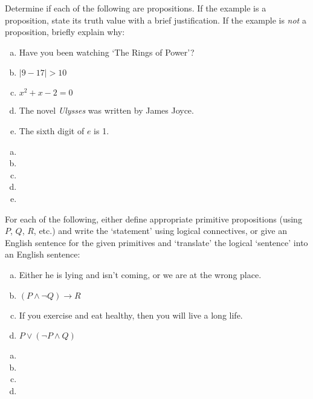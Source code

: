 \documentclass[11pt,letterpaper]{article}
\begin{document}

 Determine if each of the following are propositions. If the example is a proposition, state its truth value with a brief justification. If the example is \textit{not} a proposition, briefly explain why:
	\begin{enumerate}[(a)]
	\item Have you been watching `The Rings of Power'?
	\item $|9 - 17| > 10$
	\item $x^2 + x - 2= 0$
	\item The novel \textit{Ulysses} was written by James Joyce. 
	\item The sixth digit of $e$ is 1.
	\end{enumerate} \pspace

\sol
\begin{enumerate}[(a)]
\item 
\item 
\item 
\item 
\item 
\end{enumerate}



\newpage



 For each of the following, either define appropriate primitive propositions (using $P$, $Q$, $R$, etc.) and write the `statement' using logical connectives, or give an English sentence for the given primitives and `translate' the logical `sentence' into an English sentence:
	\begin{enumerate}[(a)]
	\item Either he is lying and isn't coming, or we are at the wrong place. 
	\item $(P \wedge \neg Q) \to R$
	\item If you exercise and eat healthy, then you will live a long life.
	\item $P \vee (\neg P \wedge Q)$
	\end{enumerate} \pspace

\sol
\begin{enumerate}[(a)]
\item 
\item 
\item 
\item 
\end{enumerate}
\end{document}
